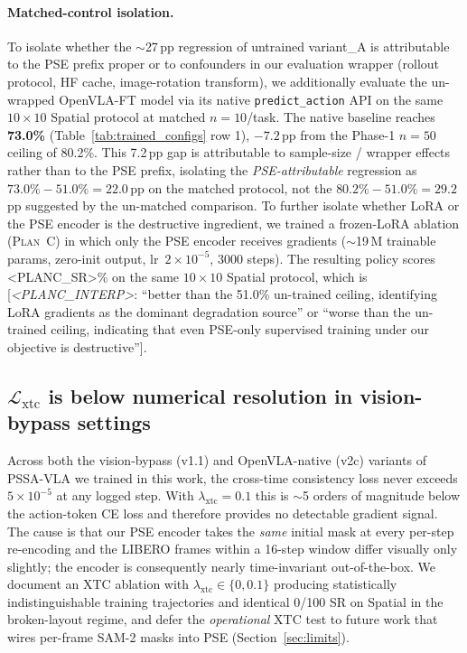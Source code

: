 \documentclass[10pt,letterpaper]{article}
\newcommand{\method}{\textsc{PSSA-VLA}\xspace}
\begin{document}
\paragraph{Matched-control isolation.} To isolate whether the
$\sim$27\,pp regression of untrained variant\_A is attributable to the
PSE prefix proper or to confounders in our evaluation wrapper
(rollout protocol, HF cache, image-rotation transform), we additionally
evaluate the un-wrapped OpenVLA-FT model via its native
\texttt{predict\_action} API on the same $10\times10$ Spatial protocol
at matched $n{=}10$/task. The native baseline reaches \textbf{73.0\%}
(Table~\ref{tab:trained_configs} row 1), $-7.2$\,pp from the Phase-1
$n{=}50$ ceiling of 80.2\%. This 7.2\,pp gap is attributable to
sample-size / wrapper effects rather than to the PSE prefix, isolating
the \emph{PSE-attributable} regression as $73.0\% - 51.0\% = 22.0$\,pp
on the matched protocol, not the $80.2\% - 51.0\% = 29.2$\,pp suggested
by the un-matched comparison. To further isolate whether LoRA or the PSE encoder is the destructive
ingredient, we trained a frozen-LoRA ablation
(\textsc{Plan~C}) in which only the PSE encoder receives gradients
($\sim$19\,M trainable params, zero-init output, lr~$2\!\times\!10^{-5}$,
3000 steps). The resulting policy scores <PLANC_SR>\% on the same
$10\times10$ Spatial protocol, which is [\emph{<PLANC_INTERP>}: ``better than the
51.0\% un-trained ceiling, identifying LoRA gradients as the dominant
degradation source'' or ``worse than the un-trained ceiling, indicating
that even PSE-only supervised training under our objective is
destructive''].

\subsection{$\mathcal{L}_\text{xtc}$ is below numerical resolution in
vision-bypass settings}
\label{sec:exp_xtc_dead}

Across both the vision-bypass (v1.1) and OpenVLA-native (v2c) variants of
\method we trained in this work, the cross-time consistency loss never
exceeds $5\!\times\!10^{-5}$ at any logged step. With $\lambda_{\text{xtc}}{=}0.1$
this is $\sim$5 orders of magnitude below the action-token CE loss and
therefore provides no detectable gradient signal. The cause is that our
PSE encoder takes the \emph{same} initial mask at every per-step
re-encoding and the LIBERO frames within a 16-step window differ
visually only slightly; the encoder is consequently nearly time-invariant
out-of-the-box. We document an XTC ablation with $\lambda_{\text{xtc}}\in\{0, 0.1\}$
producing statistically indistinguishable training trajectories and
identical 0/100 SR on Spatial in the broken-layout regime, and defer
the \emph{operational} XTC test to future work that wires per-frame
SAM-2 masks into PSE (Section~\ref{sec:limits}).
\end{document}
